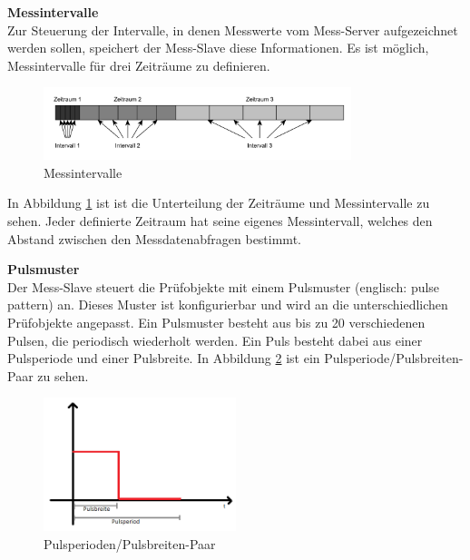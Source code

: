 \textbf{Messintervalle}\\
Zur Steuerung der Intervalle, in denen Messwerte vom Mess-Server aufgezeichnet werden sollen, speichert der Mess-Slave diese Informationen. Es ist möglich, Messintervalle für drei Zeiträume zu definieren.



\begin{figure}[H]
\begin{center}
\includegraphics[width=0.8\textwidth]{img/general/Messintervalle.pdf}
\caption{Messintervalle}
\label{figure_Messintervalle}
\end{center}
\end{figure}

In Abbildung \ref{figure_Messintervalle} ist ist die Unterteilung der Zeiträume und Messintervalle zu sehen. Jeder definierte Zeitraum hat seine eigenes Messintervall, welches den Abstand zwischen den Messdatenabfragen bestimmt.\ 

\textbf{Pulsmuster}\\
Der Mess-Slave steuert die Prüfobjekte mit einem Pulsmuster (englisch: pulse pattern) an. Dieses Muster ist konfigurierbar und wird an die unterschiedlichen Prüfobjekte angepasst. Ein Pulsmuster besteht aus bis zu 20 verschiedenen Pulsen, die periodisch wiederholt werden. Ein Puls besteht dabei aus einer Pulsperiode und einer Pulsbreite. In Abbildung \ref{figure_Pulsepattern} ist ein Pulsperiode/Pulsbreiten-Paar zu sehen.\\



\begin{figure}[H]
\begin{center}
\includegraphics[width=0.5\textwidth]{img/general/PulseMuster.png}
\caption{Pulsperioden/Pulsbreiten-Paar}
\label{figure_Pulsepattern}
\end{center}
\end{figure}



